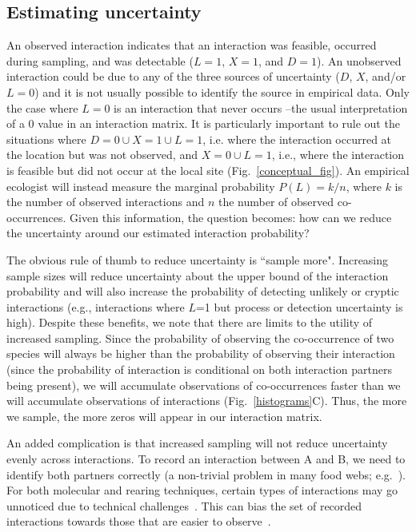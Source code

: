 \documentclass[12pt]{article}
\begin{document}
\begin{spacing}{2.0}
    \subsection*{Estimating uncertainty}

        An observed interaction indicates that an interaction was feasible, occurred during sampling, and was detectable ($L = 1$, $X = 1$, and $D = 1$). An unobserved interaction could be due to any of the three sources of uncertainty ($D$, $X$, and/or $L = 0$) and it is not usually possible to identify the source in empirical data. Only the case where $L = 0$ is an interaction that never occurs --the usual interpretation of a $0$ value in an interaction matrix. It is particularly important to rule out the situations where $D=0 \cup X = 1 \cup L=1$, i.e. where the interaction occurred at the location but was not observed, and $X = 0 \cup L =1$, i.e., where the interaction is feasible but did not occur at the local site (Fig.~\ref{conceptual_fig}). An empirical ecologist will instead measure the marginal probability $P(L) = k/n$, where $k$ is the number of observed interactions and $n$ the number of observed co-occurrences. Given this information, the question becomes: how can we reduce the uncertainty around our estimated interaction probability?


        The obvious rule of thumb to reduce uncertainty is ``sample more". Increasing sample sizes will reduce uncertainty about the upper bound of the interaction probability and will also increase the probability of detecting unlikely or cryptic interactions (e.g., interactions where $L$=1 but process or detection uncertainty is high). Despite these benefits, we note that there are limits to the utility of increased sampling. Since the probability of observing the co-occurrence of two species will always be higher than the probability of observing their interaction (since the probability of interaction is conditional on both interaction partners being present), we will accumulate observations of co-occurrences faster than we will accumulate observations of interactions (Fig.~\ref{histograms}C). Thus, the more we sample, the more zeros will appear in our interaction matrix.


        An added complication is that increased sampling will not reduce uncertainty evenly across interactions. To record an interaction between A and B, we need to identify both partners correctly (a non-trivial problem in many food webs; e.g.~\citealp{Kaartinen2011,Roslin2016}). For both molecular and rearing techniques, certain types of interactions may go unnoticed due to technical challenges~\citep{Wirta2014}. This can bias the set of recorded interactions towards those that are easier to observe~\citep{Carstensen2014,Jordano2016}.



\end{spacing}
\end{document}
